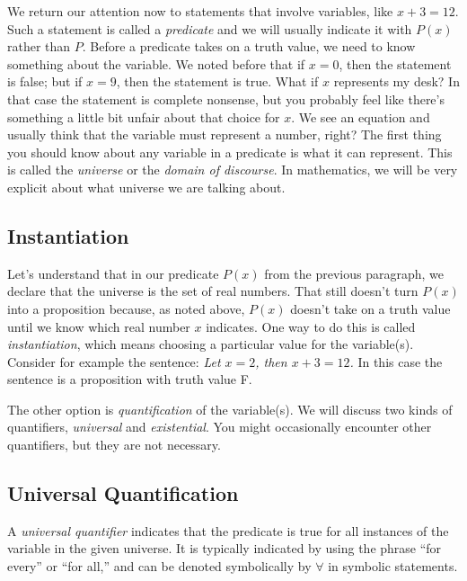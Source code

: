 We return our attention now to statements that involve variables, like $x+3=12$. Such a statement is called a \emph{predicate} and we will usually indicate it with $P(x)$ rather than $P$. Before a predicate takes on a truth value, we need to know something about the variable. We noted before that if $x=0$, then the statement is false; but if $x=9$, then the statement is true. What if $x$ represents my desk? In that case the statement is complete nonsense, but you probably feel like there's something a little bit unfair about that choice for $x$. We see an equation and usually think that the variable must represent a number, right? The first thing you should know about any variable in a predicate is what it can represent. This is called the \emph{universe} or the \emph{domain of discourse}.  In mathematics, we will be very explicit about what universe we are talking about.

\subsection{Instantiation}

Let's understand that in our predicate $P(x)$ from the previous paragraph, we declare that the universe is the set of real numbers. That still doesn't turn $P(x)$ into a proposition because, as noted above, $P(x)$ doesn't take on a truth value until we know which real number $x$ indicates. One way to do this is called \emph{instantiation},  which means choosing a particular value for the variable(s). Consider for example the sentence: \emph{Let $x=2$, then $x+3=12$.} In this case the sentence is a proposition with truth value F.

The other option is \emph{quantification} of the variable(s). We will discuss two kinds of quantifiers, \emph{universal} and \emph{existential}.  You might occasionally encounter other quantifiers, but they are not necessary. 

\subsection{Universal Quantification}

\begin{definition}
A \emph{universal quantifier} indicates that the predicate is true for all instances of the variable in the given universe.  It is typically indicated by using the phrase ``for every'' or ``for all,'' and can be denoted symbolically by $\forall$ in symbolic statements. 
\end{definition}

